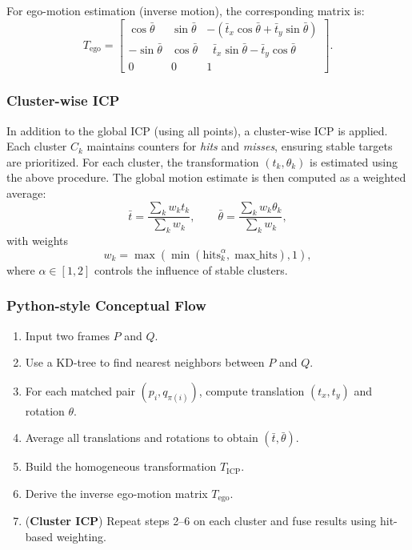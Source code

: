 For ego-motion estimation (inverse motion), the corresponding matrix is:
\[
T_{\text{ego}} =
\begin{bmatrix}
\cos\bar{\theta} & \sin\bar{\theta} & -(\bar{t}_x \cos\bar{\theta} + \bar{t}_y \sin\bar{\theta}) \\
-\sin\bar{\theta} & \cos\bar{\theta} & \;\;\bar{t}_x \sin\bar{\theta} - \bar{t}_y \cos\bar{\theta} \\
0 & 0 & 1
\end{bmatrix}.
\]

\subsubsection*{Cluster-wise ICP}
In addition to the global ICP (using all points), a cluster-wise ICP is applied.  
Each cluster $C_k$ maintains counters for \emph{hits} and \emph{misses}, ensuring stable targets are prioritized.  
For each cluster, the transformation $(t_k, \theta_k)$ is estimated using the above procedure.  
The global motion estimate is then computed as a weighted average:
\[
\bar{t} = \frac{\sum_k w_k t_k}{\sum_k w_k}, \qquad
\bar{\theta} = \frac{\sum_k w_k \theta_k}{\sum_k w_k},
\]
with weights
\[
w_k = \max\!\left(\min\!\left(\text{hits}_k^{\alpha}, \; \text{max\_hits}\right), 1\right),
\]
where $\alpha \in [1,2]$ controls the influence of stable clusters.

\subsubsection*{Python-style Conceptual Flow}
\begin{enumerate}
    \item Input two frames $P$ and $Q$.
    \item Use a KD-tree to find nearest neighbors between $P$ and $Q$.
    \item For each matched pair $(p_i,q_{\pi(i)})$, compute translation $(t_x,t_y)$ and rotation $\theta$.
    \item Average all translations and rotations to obtain $(\bar{t},\bar{\theta})$.
    \item Build the homogeneous transformation $T_{\text{ICP}}$.
    \item Derive the inverse ego-motion matrix $T_{\text{ego}}$.
    \item (\textbf{Cluster ICP}) Repeat steps 2–6 on each cluster and fuse results using hit-based weighting.
\end{enumerate}
